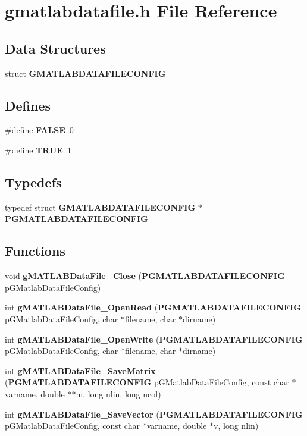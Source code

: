\section{gmatlabdatafile.h File Reference}
\label{gmatlabdatafile_8h}
\subsection*{Data Structures}
\begin{DoxyCompactItemize}
\item 
struct {\bf GMATLABDATAFILECONFIG}
\end{DoxyCompactItemize}
\subsection*{Defines}
\begin{DoxyCompactItemize}
\item 
\#define {\bf FALSE}~0
\item 
\#define {\bf TRUE}~1
\end{DoxyCompactItemize}
\subsection*{Typedefs}
\begin{DoxyCompactItemize}
\item 
typedef struct {\bf GMATLABDATAFILECONFIG} $\ast$ {\bf PGMATLABDATAFILECONFIG}
\end{DoxyCompactItemize}
\subsection*{Functions}
\begin{DoxyCompactItemize}
\item 
void {\bf gMATLABDataFile\_\-Close} ({\bf PGMATLABDATAFILECONFIG} pGMatlabDataFileConfig)
\item 
int {\bf gMATLABDataFile\_\-OpenRead} ({\bf PGMATLABDATAFILECONFIG} pGMatlabDataFileConfig, char $\ast$filename, char $\ast$dirname)
\item 
int {\bf gMATLABDataFile\_\-OpenWrite} ({\bf PGMATLABDATAFILECONFIG} pGMatlabDataFileConfig, char $\ast$filename, char $\ast$dirname)
\item 
int {\bf gMATLABDataFile\_\-SaveMatrix} ({\bf PGMATLABDATAFILECONFIG} pGMatlabDataFileConfig, const char $\ast$varname, double $\ast$$\ast$m, long nlin, long ncol)
\item 
int {\bf gMATLABDataFile\_\-SaveVector} ({\bf PGMATLABDATAFILECONFIG} pGMatlabDataFileConfig, const char $\ast$varname, double $\ast$v, long nlin)
\end{DoxyCompactItemize}


